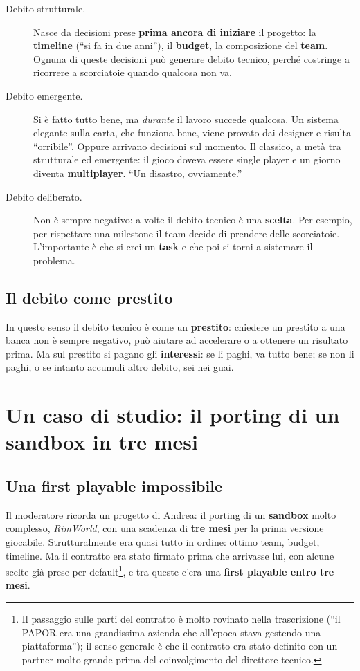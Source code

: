 \begin{description}
  \item[Debito strutturale.] Nasce da decisioni prese \textbf{prima ancora di
        iniziare} il progetto: la \textbf{timeline} (``si fa in due anni''), il
        \textbf{budget}, la composizione del \textbf{team}. Ognuna di queste
        decisioni può generare debito tecnico, perché costringe a ricorrere a
        scorciatoie quando qualcosa non va.
  \item[Debito emergente.] Si è fatto tutto bene, ma \emph{durante} il lavoro
        succede qualcosa. Un sistema elegante sulla carta, che funziona bene,
        viene provato dai designer e risulta ``orribile''. Oppure arrivano
        decisioni sul momento. Il classico, a metà tra strutturale ed emergente:
        il gioco doveva essere single player e un giorno diventa
        \textbf{multiplayer}. ``Un disastro, ovviamente.''
  \item[Debito deliberato.] Non è sempre negativo: a volte il debito tecnico è
        una \textbf{scelta}. Per esempio, per rispettare una milestone il team
        decide di prendere delle scorciatoie. L'importante è che si crei un
        \textbf{task} e che poi si torni a sistemare il problema.
\end{description}

\subsection{Il debito come prestito}

In questo senso il debito tecnico è come un \textbf{prestito}: chiedere un prestito
a una banca non è sempre negativo, può aiutare ad accelerare o a ottenere un
risultato prima. Ma sul prestito si pagano gli \textbf{interessi}: se li paghi, va
tutto bene; se non li paghi, o se intanto accumuli altro debito, sei nei guai.

\section{Un caso di studio: il porting di un sandbox in tre mesi}
\label{sec:c3-2-rimworld}

\subsection{Una first playable impossibile}

Il moderatore ricorda un progetto di Andrea: il porting di un \textbf{sandbox}
molto complesso, \emph{RimWorld}, con una scadenza di \textbf{tre mesi} per la prima
versione giocabile. Strutturalmente era quasi tutto in ordine: ottimo team, budget,
timeline. Ma il contratto era stato firmato prima che arrivasse lui, con alcune
scelte già prese per default\footnote{Il passaggio sulle parti del contratto è
molto rovinato nella trascrizione (``il PAPOR era una grandissima azienda che
all'epoca stava gestendo una piattaforma''); il senso generale è che il contratto
era stato definito con un partner molto grande prima del coinvolgimento del
direttore tecnico.}, e tra queste c'era una \textbf{first playable entro tre mesi}.

